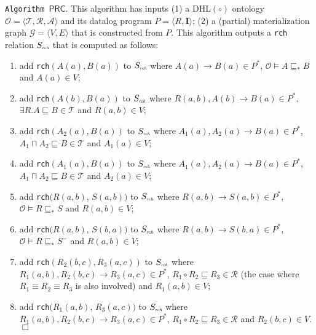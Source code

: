 \documentclass[final,1p,times]{elsarticle}
\begin{document}
\noindent\texttt{Algorithm~$\mathsf{PRC}$}. This algorithm has inputs (1)
a DHL$(\circ)$ ontology $\mathcal{O}=\langle\mathcal{T},\mathcal{R},\mathcal{A}\rangle$
and its datalog program $P=\langle R, \textbf{I}\rangle$;
(2) a (partial) materialization graph $\mathcal{G}=\langle V,E\rangle$ that is constructed from $P$.
This algorithm outputs a \texttt{rch} relation $S_{\textit{\tiny rch}}$ that
is computed as follows:

\begin{enumerate}[leftmargin=4ex,label=$\bullet$]
\item add \texttt{rch}$(A(a),B(a))$ to $S_{\textit{\tiny rch}}$ where $A(a)\rightarrow B(a)\in P^*$, $\mathcal{O}\models A\sqsubseteq_* B$ and $A(a)\in V$;

\item add \texttt{rch}$(A(b),B(a))$ to $S_{\textit{\tiny rch}}$ where $R(a,b),A(b)\rightarrow B(a)\in P^*$, $\exists R.A\sqsubseteq B\in\mathcal{T}$ and $R(a,b)\in V$;

\item add \texttt{rch}$(A_2(a),B(a))$ to $S_{\textit{\tiny rch}}$ where $A_1(a),A_2(a)\rightarrow B(a)\in P^*$,
    $A_1\sqcap A_2\sqsubseteq B\in\mathcal{T}$ and $A_1(a)\in V$;

\item add \texttt{rch}$(A_1(a),B(a))$ to $S_{\textit{\tiny rch}}$ where $A_1(a),A_2(a)\rightarrow B(a)\in P^*$,
    $A_1\sqcap A_2\sqsubseteq B\in\mathcal{T}$ and $A_2(a)\in V$;

\item add \texttt{rch}$(R(a,b)$, $S(a,b))$ to $S_{\textit{\tiny rch}}$ where $R(a,b)\rightarrow S(a,b)\in P^*$,
    $\mathcal{O}\models R\sqsubseteq_* S$ and $R(a,b)\in V$;

\item add \texttt{rch}$(R(a,b)$, $S(b,a))$ to $S_{\textit{\tiny rch}}$ where $R(a,b)\rightarrow S(b,a)\in P^*$,
    $\mathcal{O}\models R\sqsubseteq_* S^-$ and $R(a,b)\in V$;

\item add \texttt{rch}$(R_2(b,c),R_3(a,c))$ to $S_{\textit{\tiny rch}}$ where $R_1(a,b),R_2(b,c)\rightarrow R_3(a,c)\in P^*$,
    $R_1\circ R_2\sqsubseteq R_3\in\mathcal{R}$ (the case
    where $R_1\equiv R_2\equiv R_3$ is also involved) and $R_1(a,b)\in V$;

\item add \texttt{rch}$(R_1(a,b)$, $R_3(a,c))$ to $S_{\textit{\tiny rch}}$ where $R_1(a,b),R_2(b,c)\rightarrow R_3(a,c)\in P^*$,
    $R_1\circ R_2\sqsubseteq R_3\in\mathcal{R}$ and $R_2(b,c)\in V$.\hfill$\Box$
\end{enumerate}
\end{document}
